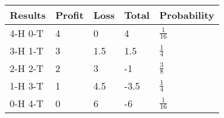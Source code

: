 \begin{tabular}{|l|l|l|l|l|}\hline
Results	&Profit	&Loss	&Total	&Probability\\\hline
4-H  0-T	&4	&0	&4	&$\frac{1}{16}$\\\hline
3-H  1-T	&3	&1.5	&1.5	&$\frac{1}{4}$\\\hline
2-H  2-T	&2	&3	&-1	&$\frac{3}{8}$\\\hline
1-H  3-T	&1	&4.5	&-3.5	&$\frac{1}{4}$\\\hline
0-H  4-T	&0	&6	&-6	&$\frac{1}{16}$\\\hline
\end{tabular}
